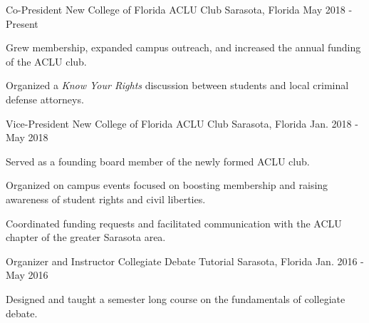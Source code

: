 

\begin{cventries}


  \cventry
    {Co-President} %
    {New College of Florida ACLU Club} %
    {Sarasota, Florida} %
    {May 2018 - Present} %
    {
      \begin{cvitems} %
        \item {Grew membership, expanded campus outreach, and increased the annual funding of the ACLU club.}
        \item {Organized a \emph{Know Your Rights} discussion between students and local criminal defense attorneys.}
      \end{cvitems}
    }

  \cventry
    {Vice-President} %
    {New College of Florida ACLU Club} %
    {Sarasota, Florida} %
    {Jan. 2018 - May 2018} %
    {
      \begin{cvitems} %
        \item {Served as a founding board member of the newly formed ACLU club.}
        \item {Organized on campus events focused on boosting membership and raising awareness of student rights and civil liberties.}
        \item {Coordinated funding requests and facilitated communication with the ACLU chapter of the greater Sarasota area.}
      \end{cvitems}
    }

  \cventry
    {Organizer and Instructor} %
    {Collegiate Debate Tutorial} %
    {Sarasota, Florida} %
    {Jan. 2016 - May 2016} %
    {
      \begin{cvitems} %
        \item {Designed and taught a semester long course on the fundamentals of collegiate debate.}
      \end{cvitems}
    }


\end{cventries}
